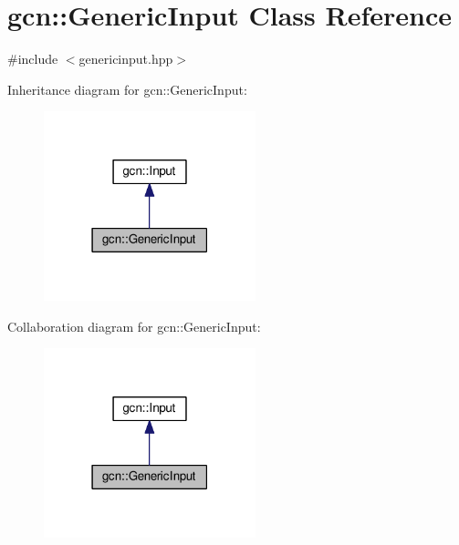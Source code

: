 \hypertarget{classgcn_1_1GenericInput}{}\section{gcn\+:\+:Generic\+Input Class Reference}
\label{classgcn_1_1GenericInput}


{\ttfamily \#include $<$genericinput.\+hpp$>$}



Inheritance diagram for gcn\+:\+:Generic\+Input\+:\nopagebreak
\begin{figure}[H]
\begin{center}
\leavevmode
\includegraphics[width=174pt]{classgcn_1_1GenericInput__inherit__graph}
\end{center}
\end{figure}


Collaboration diagram for gcn\+:\+:Generic\+Input\+:\nopagebreak
\begin{figure}[H]
\begin{center}
\leavevmode
\includegraphics[width=174pt]{classgcn_1_1GenericInput__coll__graph}
\end{center}
\end{figure}
